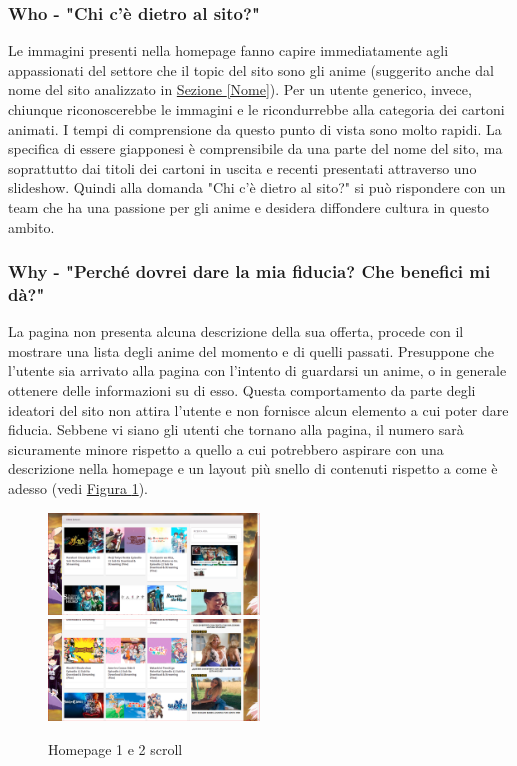 \subsubsection{Who - "Chi c'è dietro al sito?"} \label{HWho}
Le immagini presenti nella homepage fanno capire immediatamente agli appassionati del settore che il topic del sito sono gli anime (suggerito anche dal nome del sito analizzato in \hyperref[Nome]{Sezione \ref{Nome}}). Per un utente generico, invece, chiunque riconoscerebbe le immagini e le ricondurrebbe alla categoria dei cartoni animati. I tempi di comprensione da questo punto di vista sono molto rapidi. La specifica di essere giapponesi è comprensibile da una parte del nome del sito, ma soprattutto dai titoli dei cartoni in uscita e recenti presentati attraverso uno slideshow. Quindi alla domanda "Chi c'è dietro al sito?" si può rispondere con un team che ha una passione per gli anime e desidera diffondere cultura in questo ambito.

\subsubsection{Why - "Perché dovrei dare la mia fiducia? Che benefici mi dà?"} \label{HWhy}
La pagina non presenta alcuna descrizione della sua offerta, procede con il mostrare una lista degli anime del momento e di quelli passati. Presuppone che l'utente sia arrivato alla pagina con l'intento di guardarsi un anime, o in generale ottenere delle informazioni su di esso. Questa comportamento da parte degli ideatori del sito non attira l'utente e non fornisce alcun elemento a cui poter dare fiducia. Sebbene vi siano gli utenti che tornano alla pagina, il numero sarà sicuramente minore rispetto a quello a cui potrebbero aspirare con una descrizione nella homepage e un layout più snello di contenuti rispetto a come è adesso (vedi \hyperref[img2]{Figura \ref{img2}}).

\begin{figure}[H]
	\includegraphics[width=0.5\textwidth]{img/homepage02.png}
	\includegraphics[width=0.5\textwidth]{img/homepage03.png}
	\caption{Homepage 1 e 2 scroll} 
	\label{img2} 
\end{figure}

